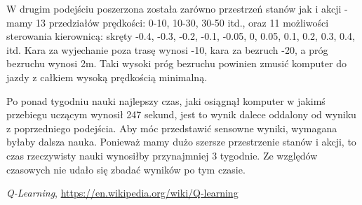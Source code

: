 \documentclass{article}
\begin{document}
W drugim podejściu poszerzona została zarówno przestrzeń stanów jak i akcji - mamy 13 przedziałów prędkości: 0-10, 10-30, 30-50 itd., oraz 11 możliwości sterowania kierownicą: skręty -0.4, -0.3, -0.2, -0.1, -0.05, 0, 0.05, 0.1, 0.2, 0.3, 0.4, itd. Kara za wyjechanie poza trasę wynosi -10, kara za bezruch -20, a próg bezruchu wynosi 2m. Taki wysoki próg bezruchu powinien zmusić komputer do jazdy z całkiem wysoką prędkością minimalną.

Po ponad tygodniu nauki najlepszy czas, jaki osiągnął komputer w jakimś przebiegu uczącym wynosił 247 sekund, jest to wynik dalece oddalony od wyniku z poprzedniego podejścia. Aby móc przedstawić sensowne wyniki, wymagana byłaby dalsza nauka. Ponieważ mamy dużo szersze przestrzenie stanów i akcji, to czas rzeczywisty nauki wynosiłby przynajmniej 3 tygodnie. Ze względów czasowych nie udało się zbadać wyników po tym czasie.




\begin{thebibliography}{9} 

\emph{Q-Learning},
\url{https://en.wikipedia.org/wiki/Q-learning}

\end{thebibliography}
\end{document}
